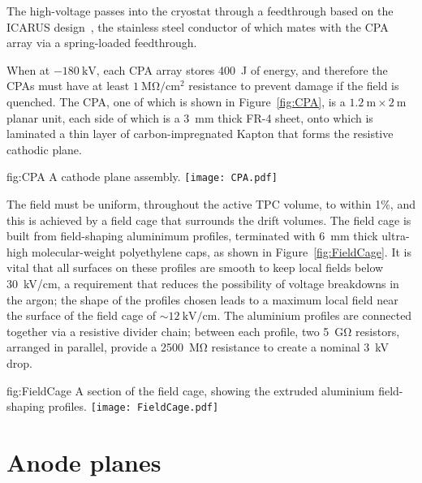 The high-voltage passes into the cryostat through a feedthrough based on the ICARUS design~\cite{ref:ICARUSFeedthrough}, %
the stainless steel conductor of which mates with the CPA array via a spring-loaded feedthrough.

When at $-\SI{180}{\kilo\volt}$, each CPA array stores \SI{400}{\joule} of energy, and therefore the CPAs must have at least $\SI{1}{\mega\ohm/\cm^{2}}$ resistance to prevent damage if the field is quenched. The CPA, one of which is shown in Figure~\ref{fig:CPA}, is a $\SI{1.2}{\meter}\times\SI{2}{\meter}$ planar unit, each side of which is a \SI{3}{\mm} thick FR-4 sheet, onto which is laminated a thin layer of carbon-impregnated Kapton that forms the resistive cathodic plane.

\begin{dunefigure}{fig:CPA}
{A cathode plane assembly.}
\texttt{[image: CPA.pdf]}
\end{dunefigure}

The field must be uniform, throughout the active TPC volume, to within 1\%, and this is achieved by a field cage that surrounds the drift volumes. The field cage is built from field-shaping aluminimum profiles, terminated with \SI{6}{\mm} thick ultra-high molecular-weight polyethylene caps, as shown in Figure~\ref{fig:FieldCage}. It is vital that all surfaces on these profiles are smooth to keep local fields below \SI{30}{\kilo\volt/\cm}, a requirement that reduces the possibility of voltage breakdowns in the argon; the shape of the profiles chosen leads to a maximum local field near the surface of the field cage of $\sim\!\SI{12}{\kilo\volt/\cm}$. The aluminium profiles are connected together via a resistive divider chain; between each profile, two \SI{5}{\giga\ohm} resistors, arranged in parallel, provide a \SI{2500}{\mega\ohm} resistance to create a nominal \SI{3}{\kilo\volt} drop.

\begin{dunefigure}{fig:FieldCage}
{A section of the field cage, showing the extruded aluminium field-shaping profiles.}
\texttt{[image: FieldCage.pdf]}
\end{dunefigure}

\section{Anode planes}
\label{sec:fdsp-exec-apas}

